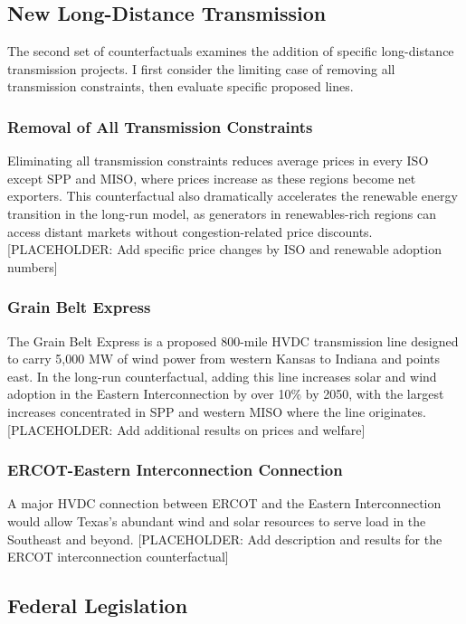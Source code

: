 \documentclass[12pt]{article}
\begin{document}
\subsection{New Long-Distance Transmission}

The second set of counterfactuals examines the addition of specific long-distance transmission projects. I first consider the limiting case of removing all transmission constraints, then evaluate specific proposed lines.

\subsubsection{Removal of All Transmission Constraints}

Eliminating all transmission constraints reduces average prices in every ISO except SPP and MISO, where prices increase as these regions become net exporters. This counterfactual also dramatically accelerates the renewable energy transition in the long-run model, as generators in renewables-rich regions can access distant markets without congestion-related price discounts. [PLACEHOLDER: Add specific price changes by ISO and renewable adoption numbers]

\subsubsection{Grain Belt Express}

The Grain Belt Express is a proposed 800-mile HVDC transmission line designed to carry 5,000 MW of wind power from western Kansas to Indiana and points east. In the long-run counterfactual, adding this line increases solar and wind adoption in the Eastern Interconnection by over 10\% by 2050, with the largest increases concentrated in SPP and western MISO where the line originates. [PLACEHOLDER: Add additional results on prices and welfare]

\subsubsection{ERCOT-Eastern Interconnection Connection}

A major HVDC connection between ERCOT and the Eastern Interconnection would allow Texas's abundant wind and solar resources to serve load in the Southeast and beyond. [PLACEHOLDER: Add description and results for the ERCOT interconnection counterfactual]

\subsection{Federal Legislation}
\end{document}

